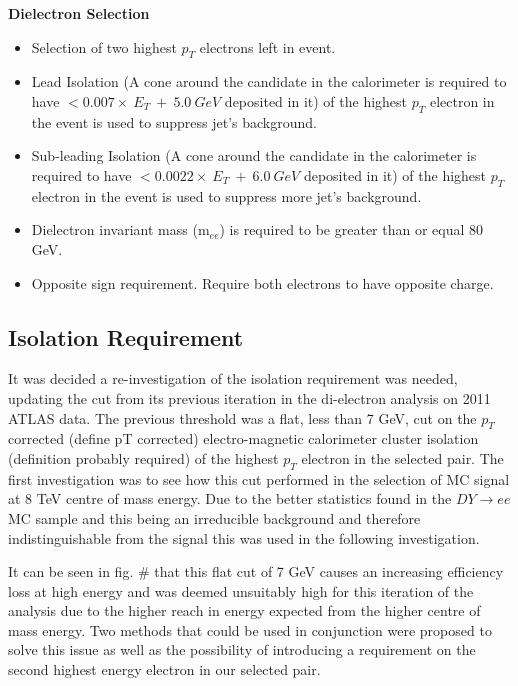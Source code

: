 {\bf Dielectron Selection}
\begin{itemize}
\item Selection of two highest $p_{T}$ electrons left in event.
\item Lead Isolation (A cone around the candidate in the calorimeter is required to have $< 0.007\times~E_{T}~+~5.0~GeV$ deposited in it) of the highest $p_{T}$ electron in the event is used to suppress jet's background. 
\item Sub-leading Isolation (A cone around the candidate in the calorimeter is required to have $< 0.0022\times~E_{T}~+~6.0~GeV$ deposited in it) of the highest $p_{T}$ electron in the event is used to suppress more jet's background. 
\item Dielectron invariant mass (m$_{ee}$) is required to be greater than or equal 80 GeV.
\item Opposite sign requirement. Require both electrons to have opposite charge.
\end{itemize}




\subsection{Isolation Requirement}

It was decided a re-investigation of the isolation requirement was needed, updating the cut from its previous iteration in the di-electron analysis on 2011 ATLAS data. The previous threshold was a flat, less than 7 GeV, cut on the $p_{T}$ corrected (define pT corrected) electro-magnetic calorimeter cluster isolation (definition probably required) of the highest $p_{T}$ electron in the selected pair. The first investigation was to see how this cut performed in the selection of MC signal at 8 TeV centre of mass energy. Due to the better statistics found in the $DY{\rightarrow}ee$ MC sample and this being an irreducible background and therefore indistinguishable from the signal this was used in the following investigation.

It can be seen in fig. \# that this flat cut of 7 GeV causes an increasing efficiency loss at high energy and was deemed unsuitably high for this iteration of the analysis due to the higher reach in energy expected from the higher centre of mass energy. Two methods that could be used in conjunction were proposed to solve this issue as well as the possibility of introducing a requirement on the second highest energy electron in our selected pair.

